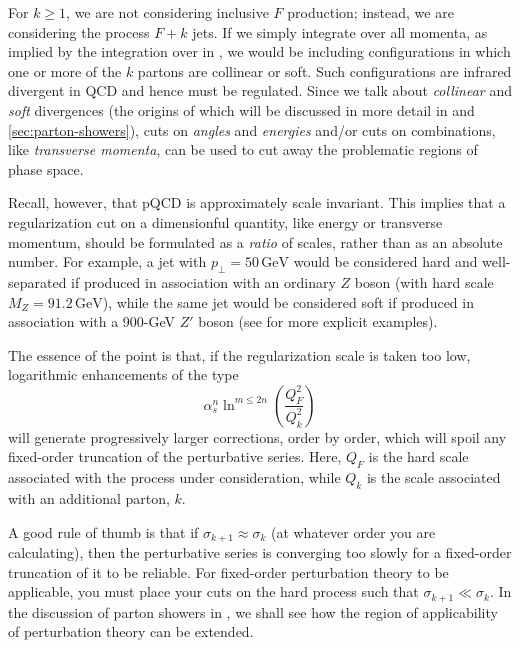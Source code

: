 %
%
For $k\ge1$, we are  not considering inclusive
$F$ production; instead, we are considering the process
$F+k$ jets. If we simply  
integrate over all momenta, as implied by the integration over 
in , we would be including configurations in
which one or more of the $k$ partons are collinear or soft. Such
configurations are infrared divergent in QCD and hence must be
regulated. Since we talk about \emph{collinear} and \emph{soft}
divergences (the origins of which will be discussed in more detail
in  and \ref{sec:parton-showers}), 
cuts on \emph{angles} and \emph{energies} and/or cuts on
combinations, like \emph{transverse momenta}, can be used
to cut away the problematic regions of phase space. 

Recall, however, that pQCD is approximately scale invariant. This
implies that 
%
a regularization cut on a dimensionful quantity, like energy or
transverse momentum, should be formulated as a \emph{ratio} of scales,
rather than as an absolute number. 
%
For example, a jet with $p_\perp = 50\,\mathrm{GeV}$ 
would be considered hard and well-separated if produced in association with
an ordinary $Z$ boson (with hard scale $M_Z=91.2\,\mathrm{GeV}$), 
while the same jet would be considered soft if produced
in association with a 900-GeV $Z'$ boson
(see \cite{Plehn:2005cq,Alwall:2008qv} for more explicit
examples).

%
%
The essence of the point is that, 
if the regularization scale is taken too low, logarithmic
enhancements of the type 
\begin{equation}
\alpha_s^n\ln^{m\le 2n}\left(\frac{Q_F^2}{Q_k^2}\right)
\label{eq:logs}
\end{equation}
will generate progressively larger corrections, order by order, which
will spoil any fixed-order truncation of the perturbative
series. Here, $Q_F$ is the hard scale associated with the process
under consideration, while $Q_k$ is the scale associated with an
additional parton, $k$. 

%
A good rule of thumb
is that if $\sigma_{k+1} \approx \sigma_{k}$ (at whatever order you
are calculating), then the perturbative series is 
converging too slowly for a fixed-order truncation
of it to be reliable. For fixed-order perturbation theory to be
applicable, you must place your cuts on the hard process such that 
$\sigma_{k+1} \ll \sigma_{k}$. In the
discussion of parton showers in
, we shall see how the region of
applicability of perturbation theory can be extended.  

